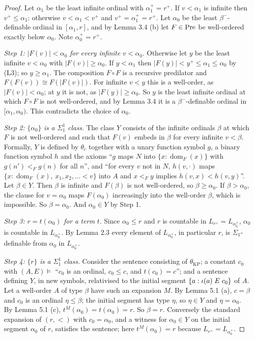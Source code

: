 \documentclass[11pt]{article}
\begin{document}
\begin{proof} Let $\alpha_1$ be the least infinite ordinal with $\alpha_1^+ = r^+$. If $v < \alpha_1$ is infinite
then $v^+ \le \alpha_1$: otherwise $v < \alpha_1 < v^+$ and $v^+ = \alpha_1^+ = r^+$. Let $\alpha_0$ be the least
$\beta^-$-definable ordinal in $[\alpha_1, r]$, and by Lemma 3.4 (b) let $F \in \mathrm{Pre}$ be well-ordered exactly below
$\alpha_0$. Note $\alpha_0^+ = r^+$.

\emph{Step 1: $|F(v)| < \alpha_0$ for every infinite $v < \alpha_0$.} Otherwise let $y$ be the least infinite
$v < \alpha_0$ with $|F(v)| \ge \alpha_0$. If $y < \alpha_1$ then $|F(y)| < y^+ \le \alpha_1 \le \alpha_0$ by (L3);
so $y \ge \alpha_1$. The composition $F \circ F$ is a recursive predilator and $F(F(v)) \cong F(|F(v)|)$. For
infinite $v < y$ this is a well-order, as $|F(v)| < \alpha_0$; at $y$ it is not, as $|F(y)| \ge \alpha_0$. So $y$
is the least infinite ordinal at which $F \circ F$ is not well-ordered, and by Lemma 3.4 it is a $\beta^-$-definable
ordinal in $[\alpha_1, \alpha_0)$. This contradicts the choice of $\alpha_0$.

\emph{Step 2: $\{\alpha_0\}$ is a $\Sigma^1_1$ class.} The class $Y$ consists of the infinite ordinals $\beta$ at
which $F$ is not well-ordered and such that $F(v)$ embeds in $\beta$ for every infinite $v < \beta$. Formally, $Y$ is
defined by $\theta_c$ together with a unary function symbol $g$, a binary function symbol $h$ and the axioms
``$g$ maps $N$ into $\{x : \operatorname{dom}_F(x)\}$ with $g(n') <_F g(n)$ for all $n$'', and ``for every $v$ not
in $N$, $h(v, \cdot)$ maps $\{x : \operatorname{dom}_F(x),\ x_1, x_2, \dots < v\}$ into $A$ and $x <_F y$ implies
$h(v, x) < h(v, y)$''. Let $\beta \in Y$. Then $\beta$ is infinite and $F(\beta)$ is not well-ordered, so
$\beta \ge \alpha_0$. If $\beta > \alpha_0$, the clause for $v = \alpha_0$ maps $F(\alpha_0)$ increasingly into the
well-order $\beta$, which is impossible. So $\beta = \alpha_0$. And $\alpha_0 \in Y$ by Step 1.

\emph{Step 3: $r = t(\alpha_0)$ for a term $t$.} Since $\alpha_0 \le r$ and $r$ is countable in
$L_{r^+} = L_{\alpha_0^+}$, $\alpha_0$ is countable in $L_{\alpha_0^+}$. By Lemma 2.3 every element of
$L_{\alpha_0^+}$, in particular $r$, is $\Sigma_1$-definable from $\alpha_0$ in $L_{\alpha_0^+}$.

\emph{Step 4: $\{r\}$ is a $\Sigma^1_1$ class.} Consider the sentence consisting of $\theta_{\mathrm{KP}}$; a
constant $c_0$ with $(A, E) \models$ ``$c_0$ is an ordinal, $c_0 \le c$, and $t(c_0) = c$''; and a sentence
defining $Y$, in new symbols, relativised to the initial segment $\{a : \iota(a) \mathrel{E} c_0\}$ of $A$. Let a well-order
$A$ of type $\beta$ have such an expansion $M$. By Lemma 5.1 (a), $c = \beta$ and $c_0$ is an ordinal
$\eta \le \beta$; the initial segment has type $\eta$, so $\eta \in Y$ and $\eta = \alpha_0$. By Lemma 5.1 (c),
$t^M(\alpha_0) = t(\alpha_0) = r$. So $\beta = r$. Conversely the standard expansion of $(r, <)$ with
$c_0 = \alpha_0$, and a witness for $\alpha_0 \in Y$ on the initial segment $\alpha_0$ of $r$, satisfies the
sentence; here $t^M(\alpha_0) = r$ because $L_{r^+} = L_{\alpha_0^+}$.
\end{proof}
\end{document}

